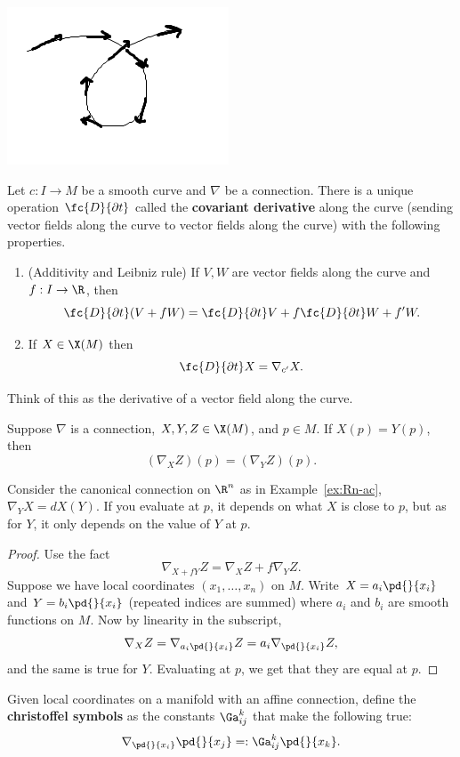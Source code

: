 \begin{center}
\includegraphics{5-1}
\end{center}

\begin{df}
Let $c:I\to M$ be a smooth curve and $\nabla$ be a connection. There is a unique operation $\fc{D}{\partial t}$ called the \textbf{covariant derivative} along the curve (sending vector fields along the curve to vector fields along the curve) with the following properties.
\begin{enumerate}
\item (Additivity and Leibniz rule)
If $V,W$ are vector fields along the curve and $f:I\to \R$, then
\[
\fc{D}{\partial t}(V+fW)= \fc{D}{\partial t}V+f\fc{D}{\partial t}W+f'W.
\]
\item If $X\in \X(M)$ then
\[
\fc{D}{\partial t}X=\nabla_{c'}X.
\]
\end{enumerate}
\end{df}
Think of this as the derivative of a vector field along the curve.

\begin{pr}
Suppose $\nabla$ is a connection, $X,Y,Z\in \X(M)$, and $p\in M$. If $X(p)=Y(p)$, then 
\[
(\nabla_X Z)(p)=(\nabla_Y Z)(p).
\]
\end{pr}
Consider the canonical connection on $\R^n$ as in Example~\ref{ex:Rn-ac}, %
$\nabla_YX%
=dX(Y)$. %
If you evaluate at $p$, it depends on what $X$ is close to $p$, but as for $Y$, it only depends on the value of $Y$ at $p$.

\begin{proof}
Use the fact
\[
\nabla_{X+fY}Z=\nabla_XZ+f\nabla_YZ.
\]
Suppose we have local coordinates $(x_1,\ldots, x_n)$ on $M$. Write $X=a_i\pd{}{x_i}$ and $Y=b_i\pd{}{x_i}$ (repeated indices are summed) where $a_i$ and $b_i$ are smooth functions on $M$. Now by linearity in the subscript,
\[
\nabla_XZ=\nabla_{a_i\pd{}{x_i}}Z=a_i \nabla_{\pd{}{x_i}}Z,
\]
and the same is true for $Y$. Evaluating at $p$, we get that they are equal at $p$.
\end{proof}
\begin{df}
Given local coordinates on a manifold with an affine connection, define the \textbf{christoffel symbols} as the constants $\Ga_{ij}^k$ that make the following true:
\[
\nabla_{\pd{}{x_i}}{\pd{}{x_j}}=:\Ga_{ij}^k \pd{}{x_k}.
\]
\end{df}

